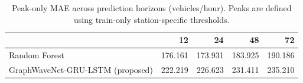 \begin{table}
\caption{Peak-only MAE across prediction horizons (vehicles/hour). Peaks are defined using train-only station-specific thresholds.}
\label{tab:peak_mae}
\begin{tabular}{lrrrr}
\toprule
 & 12 & 24 & 48 & 72 \\
\midrule
Random Forest & 176.161 & 173.931 & 183.925 & 190.186 \\
GraphWaveNet-GRU-LSTM (proposed) & 222.219 & 226.623 & 231.411 & 235.210 \\
\bottomrule
\end{tabular}
\end{table}
